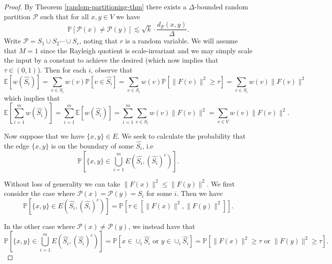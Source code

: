 \documentclass[a4paper,11pt]{article}
\theoremstyle{definition}
\newcommand{\E}[1]{\mathbb{E}\left[#1\right]}
\newcommand{\prob}[1]{\mathbb{P}\left[#1\right]}
\begin{document}
\begin{proof} By Theorem \ref{random-partitioning-thm} there exists a $\Delta$-bounded random partition $\mathcal{P}$ such that for all $x, y \in V$ we have 
\begin{equation}\label{lemma_random_part}
\prob{\mathcal{P}(x) \ne \mathcal{P}(y)} \lesssim \sqrt{k} \cdot \frac{d_F(x, y)}{\Delta}.
\end{equation}
Write $\mathcal{P} = S_1 \cup S_2 \cdots \cup S_r$, noting that $r$ is a random variable. We will assume that $M = 1$ since the Rayleigh quotient is scale-invariant and we may simply scale the input by a constant to achieve the desired (which now implies that $\tau \in (0, 1)$). Then for each $i$, observe that 
\begin{equation}\label{expectation-hat-mass}
\E{w(\hat{S_i})} = \sum_{v \in S_i}w(v)\prob{v \in \hat{S_i}} = \sum_{v \in S_i} w(v)\prob{\|F(v)\|^2 \ge \tau} = \sum_{v \in S_i} w(v)\|F(v)\|^2
\end{equation}
which implies that
\begin{equation}\label{lemma_rayleigh_denominator}
\E{\sum_{i=1}^m w(\hat{S_i})} = \sum_{i=1}^m \E{w(\hat{S_i})} = \sum_{i=1}^m \sum_{v \in S_i} w(v)\|F(v)\|^2 = \sum_{v \in V} w(v)\|F(v)\|^2.
\end{equation}

Now suppose that we have $\{x, y\} \in E$. We seek to calculate the probability that the edge $\{x, y\}$ is on the boundary of some $\hat{S_i}$, i.e
\[
\prob{\{x, y\} \in \bigcup_{i=1}^m E(\hat{S_i}, \left(\hat{S_i}\right)^c)}.
\]

Without loss of generality we can take $\|F(x)\|^2 \le \|F(y)\|^2$. 
We first consider the case where $\mathcal{P}(x) = \mathcal{P}(y) = S_i$ for some $i$. Then we have
\[
\prob{\{x, y\} \in E(\hat{S_i}, \left(\hat{S_i}\right)^c)} = \prob{\tau \in \left[ \|F(x)\|^2, \|F(y)\|^2 \right]}.
\]

In the other case where $\mathcal{P}(x) \ne \mathcal{P}(y)$, we instead have that
\[
\prob{\{x, y\} \in \bigcup_{i=1}^m E(\hat{S_i}, \left(\hat{S_i}\right)^c)} = \prob{x \in \cup_i \hat{S_i} \text{ or } y \in \cup_i \hat{S_i}} = \prob{\|F(x)\|^2 \ge \tau \text{ or } \|F(y)\|^2 \ge \tau}.
\]


\end{proof}
\end{document}

